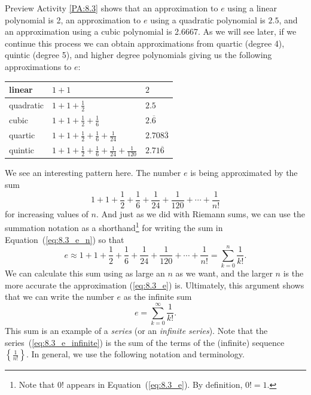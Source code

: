 Preview Activity \ref{PA:8.3} shows that an approximation to $e$ using a linear polynomial is 2, an approximation to $e$ using a quadratic polynomial is $2.5$, and an approximation using a cubic polynomial is 2.6667. As we will see later, if we continue this process we can obtain approximations from quartic (degree 4), quintic (degree 5), and higher degree polynomials giving us the following approximations to $e$:
\begin{center}
\renewcommand{\arraystretch}{1.5}
\begin{tabular}{lll} \hline
linear  &$1 + 1$              & $2$ \\ \hline
quadratic &$1 +1 + \frac{1}{2}$     & $2.5$ \\ \hline
cubic &$1 + 1 + \frac{1}{2} + \frac{1}{6}$      &$2.\overline{6}$ \\ \hline
quartic  &$1 + 1 +  \frac{1}{2} + \frac{1}{6} + \frac{1}{24}$   & $2.708\overline{3}$ \\ \hline
quintic  &$1 + 1 + \frac{1}{2} + \frac{1}{6} + \frac{1}{24} + \frac{1}{120}$    & $2.71\overline{6}$ \\ \hline
\end{tabular}
\end{center}
We see an interesting pattern here. The number $e$ is being approximated by the sum
\begin{equation} \label{eq:8.3_e_n}
1+1+\frac{1}{2} + \frac{1}{6} + \frac{1}{24} + \frac{1}{120} + \cdots + \frac{1}{n!}
\end{equation}
for increasing values of $n$.
And just as we did with Riemann sums, we can use the summation notation as a shorthand\footnote{Note that $0!$ appears in Equation~(\ref{eq:8.3_e}).  By definition, $0! = 1$.} for writing the sum in Equation~(\ref{eq:8.3_e_n}) so that
\begin{equation} \label{eq:8.3_e}
e \approx 1+1+\frac{1}{2} + \frac{1}{6} + \frac{1}{24} + \frac{1}{120} + \cdots + \frac{1}{n!} = \sum_{k=0}^n \frac{1}{k!}.
\end{equation}
We can calculate this sum using as large an $n$ as we want, and the larger $n$ is the more accurate the approximation (\ref{eq:8.3_e}) is. Ultimately, this argument shows that we can write the number $e$ as the infinite sum
\begin{equation} \label{eq:8.3_e_infinite}
e = \sum_{k=0}^{\infty} \frac{1}{k!}.
\end{equation}
This sum is an example of a \emph{series} (or an \emph{infinite series}). Note that the series~(\ref{eq:8.3_e_infinite}) is the sum of the terms of the (infinite) sequence $\left\{\frac{1}{n!}\right\}$.  In general, we use the following notation and terminology.

